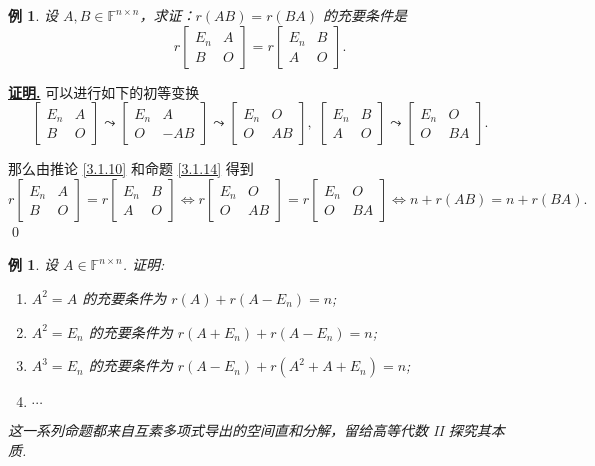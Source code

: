 \documentclass[10pt,openany]{article}
\theoremstyle{thmstyle} %
\theoremstyle{defstyle} %
\theoremstyle{prostyle} %
\theoremstyle{exastyle}
\newtheorem{example}[theorem]{例}
\theoremstyle{remstyle}
\renewenvironment{proof}[1][证明]{\par\underline{\textbf{#1.}} \;\fangsong}{\qed\par}
\newcommand{\F}{\mathbb{F}}
\newcommand{\n}{^{n \times n}}
\begin{document}
\begin{example}
	设 \( A, B \in \F\n \)，求证：\( r(AB) = r(BA) \) 的充要条件是  
	\[ r\begin{bmatrix} E_n & A \\ B & O \end{bmatrix} = r\begin{bmatrix} E_n & B \\ A & O \end{bmatrix}. \]
\end{example}

\begin{proof}
	可以进行如下的初等变换
	\[ \begin{bmatrix} E_n & A \\ B & O \end{bmatrix} \leadsto \begin{bmatrix} E_n & A \\ O & -AB \end{bmatrix} \leadsto  \begin{bmatrix} E_n & O \\ O & AB \end{bmatrix}, \;  \begin{bmatrix} E_n & B \\ A & O \end{bmatrix} \leadsto \begin{bmatrix} E_n & O \\ O & BA \end{bmatrix}. \]
	
	那么由推论 \ref{3.1.10} 和命题 \ref{3.1.14} 得到
	\[ r\begin{bmatrix} E_n & A \\ B & O \end{bmatrix} = r\begin{bmatrix} E_n & B \\ A & O \end{bmatrix} \Leftrightarrow r\begin{bmatrix} E_n & O \\ O & AB \end{bmatrix} = r\begin{bmatrix} E_n & O \\ O & BA \end{bmatrix} \Leftrightarrow n+r(AB)=n+r(BA). \]
\end{proof}



\begin{example} \label{3.1.22}
	设 \(  A \in \F\n \). 证明:
	\begin{enumerate}[(1)]
		\item \( A^2=A \) 的充要条件为 \( r(A)+r(A-E_n)=n \);
		\item \( A^2=E_n \) 的充要条件为 \( r(A+E_n)+r(A-E_n)=n \);
		\item \( A^3=E_n \) 的充要条件为 \( r(A-E_n)+r(A^2+A+E_n)=n \);
		\item \( \cdots \)
	\end{enumerate}
	
	这一系列命题都来自互素多项式导出的空间直和分解，留给高等代数 II 探究其本质.
\end{example}
\end{document}
